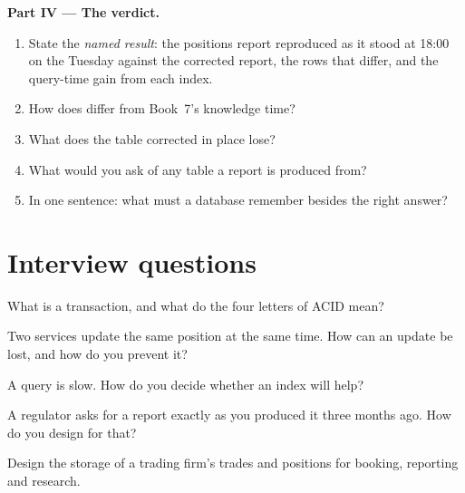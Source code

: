 \begin{problem}
\medskip\noindent\textbf{Part IV --- The verdict.}
\begin{enumerate}[resume]
\item State the \emph{named result}: the positions report reproduced as it stood at 18:00 on the Tuesday against the corrected report, the
rows that differ, and the query-time gain from each index.
\item How does  differ from Book~7's knowledge time?
\item What does the table corrected in place lose?
\item What would you ask of any table a report is produced from?
\item In one sentence: what must a database remember besides the right answer?
\end{enumerate}
\end{problem}

\section{Interview questions}

\begin{interviewq}\label{iq:pl:databases-and-sql:1}
What is a transaction, and what do the four letters of ACID mean?
\end{interviewq}

\begin{interviewq}\label{iq:pl:databases-and-sql:2}
Two services update the same position at the same time. How can an update be lost, and how do you prevent it?
\end{interviewq}

\begin{interviewq}\label{iq:pl:databases-and-sql:3}
A query is slow. How do you decide whether an index will help?
\end{interviewq}

\begin{interviewq}\label{iq:pl:databases-and-sql:4}
A regulator asks for a report exactly as you produced it three months ago. How do you design for that?
\end{interviewq}

\begin{interviewq}\label{iq:pl:databases-and-sql:5}
Design the storage of a trading firm's trades and positions for booking, reporting and research.
\end{interviewq}
